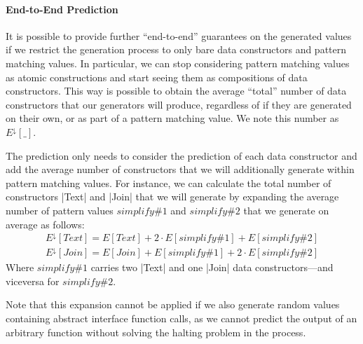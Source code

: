 \paragraph{End-to-End Prediction}
%

It is possible to provide further ``end-to-end'' guarantees on the generated
values if we restrict the generation process to only bare data constructors and
pattern matching values.
%
In particular, we can stop considering pattern matching values as atomic
constructions and start seeing them as compositions of data constructors.
%
This way is possible to obtain the average ``total'' number of data constructors
that our generators will produce, regardless of if they are generated on their
own, or as part of a pattern matching value.
%
We note this number as $E^\downarrow\![\_]$.


The prediction only needs to consider the prediction of each data constructor
and add the average number of constructors that we will additionally generate
within pattern matching values.
%
For instance, we can calculate the total number of constructors |Text| and
|Join| that we will generate by expanding the average number of pattern values
$simplify\#1$ and $simplify\#2$ that we generate on average as follows:
%
{\small
  \begin{align*}
    E^\downarrow\!\left[ Text \right]
    = E\left[ Text \right]
    + 2\! \cdot\! E\left[ simplify\#1 \right]
    + E\left[ simplify\#2 \right] \\
    E^\downarrow\!\left[ Join \right]
    = E\left[ Join \right]
    + E\left[ simplify\#1 \right]
    + 2\! \cdot\! E\left[ simplify\#2 \right]
  \end{align*}
}
%
Where $simplify\#1$ carries two |Text| and one |Join| data constructors---and
viceversa for $simplify\#2$.


Note that this expansion cannot be applied if we also generate random values
containing abstract interface function calls, as we cannot predict the output of
an arbitrary function without solving the halting problem in the process.
